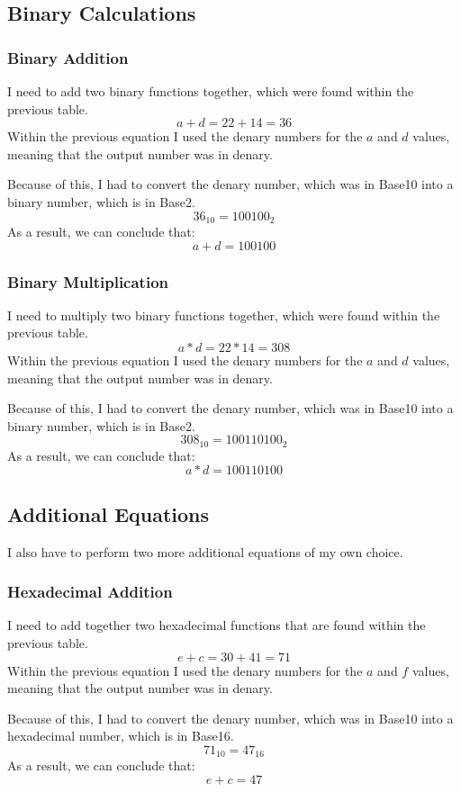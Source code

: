 \documentclass[a4paper,12pt]{article}
\begin{document}
\newpage

\subsection{Binary Calculations}
\subsubsection{Binary Addition}
I need to add two binary functions together, which were found within the previous table.
\[
  a + d = 22 + 14 = 36
\]
Within the previous equation I used the denary numbers for the $a$ and $d$ values, meaning that the output number was in denary.

Because of this, I had to convert the denary number, which was in Base10 into a binary number, which is in Base2.
\[
  36_{10} = 100100_{2}
\]
As a result, we can conclude that:
\[
  a + d = 100100
\]

\subsubsection{Binary Multiplication}
I need to multiply two binary functions together, which were found within the previous table.
\[
  a * d = 22 * 14 = 308
\]
Within the previous equation I used the denary numbers for the $a$ and $d$ values, meaning that the output number was in denary.

Because of this, I had to convert the denary number, which was in Base10 into a binary number, which is in Base2.
\[
  308_{10} = 100110100_{2}
\]
As a result, we can conclude that:
\[
  a * d = 100110100
\]

\newpage

\subsection{Additional Equations}
I also have to perform two more additional equations of my own choice.
\subsubsection{Hexadecimal Addition}
I need to add together two hexadecimal functions that are found within the previous table.
\[
  e + c = 30 + 41 = 71
\]
Within the previous equation I used the denary numbers for the $a$ and $f$ values, meaning that the output number was in denary.

Because of this, I had to convert the denary number, which was in Base10 into a hexadecimal number, which is in Base16.
\[
  71_{10} = 47_{16}
\]
As a result, we can conclude that:
\[
  e + c = 47
\]
\end{document}
